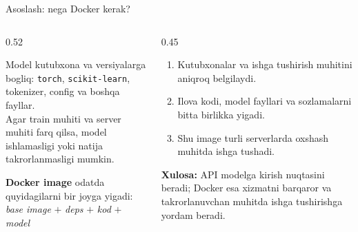 \documentclass[aspectratio=169,11pt]{beamer}
\newcommand{\uzq}{\textquotesingle{}}   %
\begin{document}
\begin{frame}{Asoslash: nega Docker kerak?}
  \small

  \begin{columns}[T,totalwidth=\textwidth]
    \begin{column}{0.52\textwidth}
      \begin{tcolorbox}[warnbox,title={Muammo},top=2pt,bottom=2pt]
        \footnotesize
        Model kutubxona va versiyalarga bog\uzq{}liq:
        \texttt{torch}, \texttt{scikit-learn}, tokenizer, config va boshqa fayllar.\\[3pt]

        Agar train muhiti va server muhiti farq qilsa, model ishlamasligi
        yoki natija takrorlanmasligi mumkin.
      \end{tcolorbox}

      \vspace{4pt}

      \begin{tcolorbox}[defbox,top=2pt,bottom=2pt]
        \footnotesize
        \textbf{Docker image} odatda quyidagilarni bir joyga yig\uzq{}adi:\\[2pt]
        \centering
        \textit{base image} $+$ \textit{deps} $+$ \textit{kod} $+$ \textit{model}
      \end{tcolorbox}
    \end{column}

    \begin{column}{0.45\textwidth}
      \begin{tcolorbox}[okbox,title={Docker nima beradi?},top=2pt,bottom=2pt]
        \footnotesize
        \begin{enumerate}\setlength\itemsep{2pt}
          \item Kutubxonalar va ishga tushirish muhitini aniqroq belgilaydi.
          \item Ilova kodi, model fayllari va sozlamalarni bitta birlikka yig\uzq{}adi.
          \item Shu image turli serverlarda o\uzq{}xshash muhitda ishga tushadi.
        \end{enumerate}
      \end{tcolorbox}

      \vspace{4pt}

      \begin{tcolorbox}[okbox,top=2pt,bottom=2pt]
        \footnotesize
        \textbf{Xulosa:}
        API modelga kirish nuqtasini beradi; Docker esa xizmatni
        barqaror va takrorlanuvchan muhitda ishga tushirishga yordam beradi.
      \end{tcolorbox}
    \end{column}
  \end{columns}
\end{frame}
\end{document}
